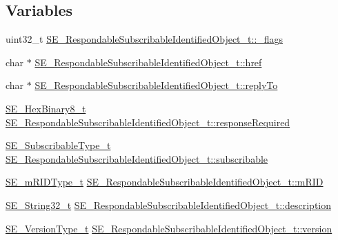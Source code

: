 \subsection*{Variables}
\begin{DoxyCompactItemize}
\item 
uint32\+\_\+t \hyperlink{group__RespondableSubscribableIdentifiedObject_gaa666043fd30e537b01f874c21f4e1137}{S\+E\+\_\+\+Respondable\+Subscribable\+Identified\+Object\+\_\+t\+::\+\_\+flags}
\item 
char $\ast$ \hyperlink{group__RespondableSubscribableIdentifiedObject_gab4bad1872ec7dff1ca79b125133dfe54}{S\+E\+\_\+\+Respondable\+Subscribable\+Identified\+Object\+\_\+t\+::href}
\item 
char $\ast$ \hyperlink{group__RespondableSubscribableIdentifiedObject_gad863d865c9bb67c7f7d9d3e77040d1ad}{S\+E\+\_\+\+Respondable\+Subscribable\+Identified\+Object\+\_\+t\+::reply\+To}
\item 
\hyperlink{group__HexBinary8_gaecf2dab3615fb954a693c017a61f77d6}{S\+E\+\_\+\+Hex\+Binary8\+\_\+t} \hyperlink{group__RespondableSubscribableIdentifiedObject_gae273cf33926a7ae6aea4c750008fb884}{S\+E\+\_\+\+Respondable\+Subscribable\+Identified\+Object\+\_\+t\+::response\+Required}
\item 
\hyperlink{group__SubscribableType_ga5c41f553d369710ed34619266bf2551e}{S\+E\+\_\+\+Subscribable\+Type\+\_\+t} \hyperlink{group__RespondableSubscribableIdentifiedObject_ga5c1d53f218cacfd624c053684090d4a8}{S\+E\+\_\+\+Respondable\+Subscribable\+Identified\+Object\+\_\+t\+::subscribable}
\item 
\hyperlink{group__mRIDType_gac74622112f3a388a2851b2289963ba5e}{S\+E\+\_\+m\+R\+I\+D\+Type\+\_\+t} \hyperlink{group__RespondableSubscribableIdentifiedObject_ga73dd144660105c95edc69f4a84188802}{S\+E\+\_\+\+Respondable\+Subscribable\+Identified\+Object\+\_\+t\+::m\+R\+ID}
\item 
\hyperlink{group__String32_gac9f59b06b168b4d2e0d45ed41699af42}{S\+E\+\_\+\+String32\+\_\+t} \hyperlink{group__RespondableSubscribableIdentifiedObject_gaef5b09933ff6bbd31bd6a1edf942d23a}{S\+E\+\_\+\+Respondable\+Subscribable\+Identified\+Object\+\_\+t\+::description}
\item 
\hyperlink{group__VersionType_ga4b8d27838226948397ed99f67d46e2ae}{S\+E\+\_\+\+Version\+Type\+\_\+t} \hyperlink{group__RespondableSubscribableIdentifiedObject_ga5479f5b7d65fae80406692691cdbf2f7}{S\+E\+\_\+\+Respondable\+Subscribable\+Identified\+Object\+\_\+t\+::version}
\end{DoxyCompactItemize}


